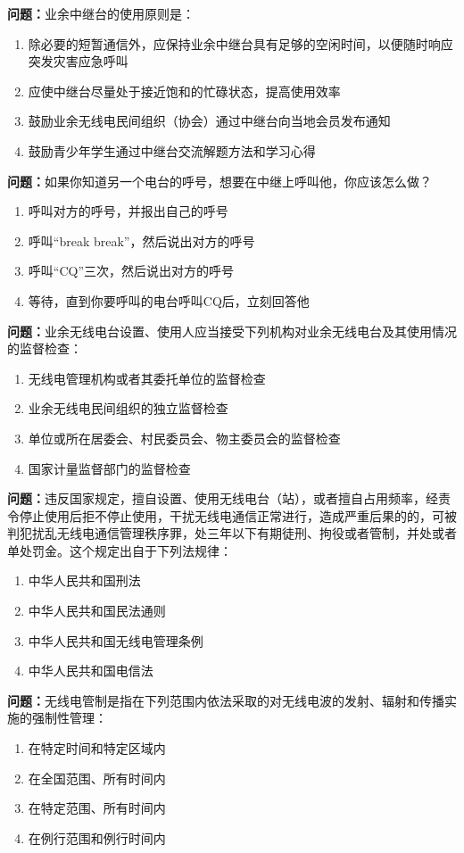 \documentclass{ctexbook}%
\begin{document}
\textbf{问题：}业余中继台的使用原则是：
\begin{enumerate}[label=\Alph*), leftmargin=3em]
\item 除必要的短暂通信外，应保持业余中继台具有足够的空闲时间，以便随时响应突发灾害应急呼叫
\item 应使中继台尽量处于接近饱和的忙碌状态，提高使用效率
\item 鼓励业余无线电民间组织（协会）通过中继台向当地会员发布通知
\item 鼓励青少年学生通过中继台交流解题方法和学习心得
\end{enumerate}

\textbf{问题：}如果你知道另一个电台的呼号，想要在中继上呼叫他，你应该怎么做？
\begin{enumerate}[label=\Alph*), leftmargin=3em]
\item 呼叫对方的呼号，并报出自己的呼号
\item 呼叫“break break”，然后说出对方的呼号
\item 呼叫“CQ”三次，然后说出对方的呼号
\item 等待，直到你要呼叫的电台呼叫CQ后，立刻回答他
\end{enumerate}

\textbf{问题：}业余无线电台设置、使用人应当接受下列机构对业余无线电台及其使用情况的监督检查：
\begin{enumerate}[label=\Alph*), leftmargin=3em]
\item 无线电管理机构或者其委托单位的监督检查
\item 业余无线电民间组织的独立监督检查
\item 单位或所在居委会、村民委员会、物主委员会的监督检查
\item 国家计量监督部门的监督检查
\end{enumerate}

\textbf{问题：}违反国家规定，擅自设置、使用无线电台（站），或者擅自占用频率，经责令停止使用后拒不停止使用，干扰无线电通信正常进行，造成严重后果的的，可被判犯扰乱无线电通信管理秩序罪，处三年以下有期徒刑、拘役或者管制，并处或者单处罚金。这个规定出自于下列法规律：
\begin{enumerate}[label=\Alph*), leftmargin=3em]
\item 中华人民共和国刑法
\item 中华人民共和国民法通则
\item 中华人民共和国无线电管理条例
\item 中华人民共和国电信法
\end{enumerate}

\textbf{问题：}无线电管制是指在下列范围内依法采取的对无线电波的发射、辐射和传播实施的强制性管理：
\begin{enumerate}[label=\Alph*), leftmargin=3em]
\item 在特定时间和特定区域内
\item 在全国范围、所有时间内
\item 在特定范围、所有时间内
\item 在例行范围和例行时间内
\end{enumerate}
\end{document}
